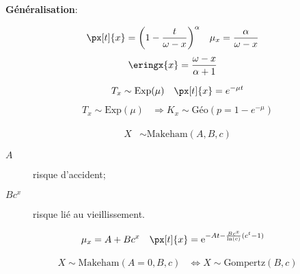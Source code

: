 \documentclass[10pt, french]{article}
\begin{document}
\begin{multicols*}{3}
\begin{definitionNOHFILLsub}
\tcbline

\textbf{Généralisation}:

\begin{align*}
	\px[t]{x} 
	&= \left( 1 - \frac{t}{\omega - x} \right)^{\alpha} &
	\mu_x 
	&=	\frac{\alpha}{\omega - x}	
\end{align*}
\begin{align*}
	\eringx{x}	
	&=	\frac{\omega - x}{\alpha + 1}
\end{align*}
\end{definitionNOHFILLsub}


\begin{definitionNOHFILLsub}
\begin{center}
\begin{align*}
	T_x 			
	&\sim 	\mathrm{Exp}(\mu) &
	\px[t]{x} 	
	&= 		e^{-\mu t}	\\
\end{align*}
\begin{align*}
	T_x \sim \text{Exp}(\mu) &\Rightarrow K_x \sim \text{Géo}(p = 1 - e^{-\mu}) 
\end{align*}
\end{center}
\end{definitionNOHFILLsub}


\begin{definitionNOHFILLsub}
\begin{align*}
	X &\sim \text{Makeham}(A, B, c) 
\end{align*}
\begin{description}
	\item[$A$]	risque d'accident;
	\item[$Bc^{x}$]	risque lié au vieillissement.
\end{description}

\begin{align*}
	\mu_x 
	&=	A + B c^{x} &
	\px[t]{x}
	&=	\textrm{e}^{-At - \frac{B c^{x}}{\ln(c)}(c^{t} - 1)}
\end{align*}

\tcbline

\begin{definitionNOHFILLsub}
	\setlength{\mathindent}{-1cm}
\begin{align*}
	X \sim \text{Makeham}(A = 0, B, c) &\Leftrightarrow X \sim \text{Gompertz}(B, c) 
\end{align*}
	\setlength{\mathindent}{1cm}
\end{definitionNOHFILLsub}
\end{definitionNOHFILLsub}


\end{multicols*}
\end{document}

